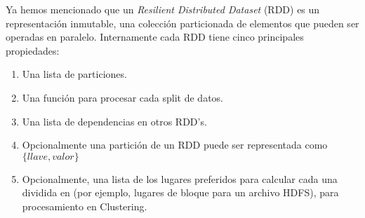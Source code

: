   Ya hemos mencionado que un \emph{Resilient Distributed Dataset} (RDD) es un representación inmutable, una colección particionada de elementos que pueden ser operadas en paralelo. Internamente cada RDD tiene cinco principales propiedades:


  \begin{enumerate}
    \item Una lista de particiones.
    \item Una función para procesar cada split de datos.
    \item Una lista de dependencias en otros RDD's. 
    \item Opcionalmente una partición de un RDD puede ser representada como $\{llave,valor\}$ 

    \item Opcionalmente, una lista de los lugares preferidos para calcular cada una dividida en (por ejemplo, lugares de bloque para un archivo HDFS), para procesamiento en Clustering.

  \end{enumerate}




















